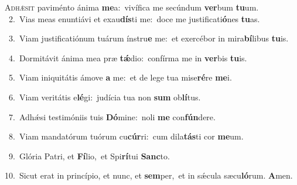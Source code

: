 \lettrine{\initial\textcolor{\initialcolor}{A}}{dhǽsit} paviménto ánima \textbf{me}\-a:~\star vivífica me secúndum \textbf{ver}\-bum \textbf{tu}\-um.\\
{\numbfont\textcolor{\numbcolor}{~2.}}~Vias meas enuntiávi et exau\-\textbf{dís}\-ti me:~\star doce me justificati\-\textbf{ó}\-nes \textbf{tu}\-as.\par
{\numbfont\textcolor{\numbcolor}{~3.}}~Viam justificatiónum tuárum ínstru\textbf{e} me:~\star et exercébor in mira\-\textbf{bí}\-libus \textbf{tu}\-is.\par
{\numbfont\textcolor{\numbcolor}{~4.}}~Dormitávit ánima mea præ \textbf{tǽ}\-dio:~\star confírma me in \textbf{ver}\-bis \textbf{tu}\-is.\par
{\numbfont\textcolor{\numbcolor}{~5.}}~Viam iniquitátis ámove \textbf{a} me:~\star et de lege tua mise\-\textbf{ré}\-re \textbf{me}\-i.\par
{\numbfont\textcolor{\numbcolor}{~6.}}~Viam veritátis e\-\textbf{lé}\-gi:~\star judícia tua non \textbf{sum} ob\-\textbf{lí}\-tus.\par
{\numbfont\textcolor{\numbcolor}{~7.}}~Adhǽsi testimóniis tuis \textbf{Dó}\-mine:~\star noli \textbf{me} con\-\textbf{fún}\-dere.\par
{\numbfont\textcolor{\numbcolor}{~8.}}~Viam mandatórum tuórum cu\-\textbf{cúr}\-ri:~\star cum dila\-\textbf{tás}\-ti cor \textbf{me}\-um.\par
{\numbfont\textcolor{\numbcolor}{~9.}}~Glória Patri, et \textbf{Fí}\-lio,~\star et Spi\-\textbf{rí}\-tui \textbf{Sanc}\-to.\par
{\numbfont\textcolor{\numbcolor}{10.}}~Sicut erat in princípio, et nunc, et \textbf{sem}\-per,~\star et in sǽcula sæcu\-\textbf{ló}\-rum. \textbf{A}\-men.\par
